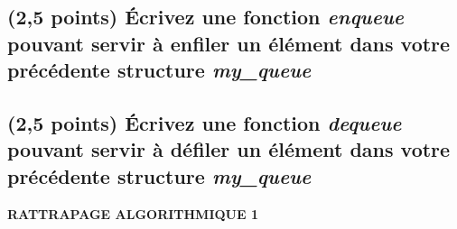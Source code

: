\documentclass[11pt,a4paper]{article}
\newcommand{\TitreMatiere}{Algorithmique 1}
\begin{document}
\bigskip

\begin{center}
\end{center}

\bigskip



\newpage


\subsection{(2,5 points) \'Ecrivez une fonction \og \textit{enqueue} \fg{} pouvant servir à enfiler un élément dans votre précédente structure \og \textit{my\_queue} \fg{} }

\bigskip

\begin{center}

\end{center}


\newpage


\subsection{(2,5 points) \'Ecrivez une fonction \og \textit{dequeue} \fg{} pouvant servir à défiler un élément dans votre précédente structure \og \textit{my\_queue} \fg{} }

\bigskip

\begin{center}
\end{center}

\bigskip


\clearpage



\vfillFirst

\begin{center}

\begin{LARGE}
\textbf{\MakeUppercase{RATTRAPAGE \TitreMatiere}}
\end{LARGE}

\end{center}

\vfillLast
\end{document}
